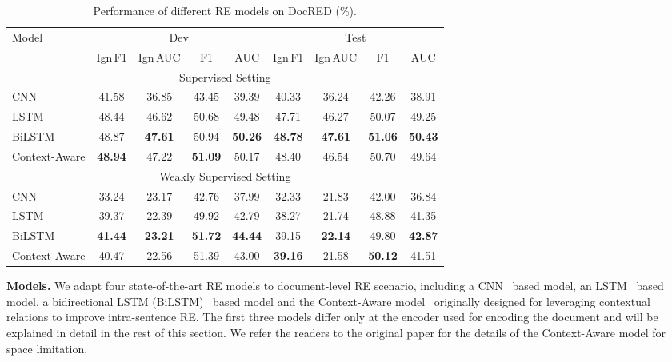 \documentclass[11pt,a4paper]{article}
\begin{document}
\begin{table*}
    \begin{center}
    \small
    \begin{tabular}{l|cccc|cccc}
    \toprule
    \multirow{2}{*}{Model} & \multicolumn{4}{c|}{Dev}& \multicolumn{4}{c}{Test} \\
     & Ign\,F1 & Ign\,AUC & F1 & AUC & Ign\,F1 & Ign\,AUC & F1 & AUC \\
    \midrule
    \multicolumn{9}{c}{Supervised Setting}\\
    \midrule
CNN & 41.58 &  36.85 & 43.45 & 39.39 & 40.33 & 36.24& 42.26 & 38.91\\
LSTM & 48.44 & 46.62 &50.68 & 49.48 & 47.71 & 46.27 & 50.07 & 49.25\\
BiLSTM & {48.87} & \textbf{47.61} & 50.94 & \textbf{50.26}  &\textbf{48.78} & \textbf{47.61} & \textbf{51.06} & \textbf{50.43}\\
Context-Aware & \textbf{48.94} & {47.22}& \textbf{51.09}& {50.17}& {48.40} & {46.54} & {50.70} & {49.64}\\    
    \midrule
    
    \multicolumn{9}{c}{Weakly Supervised Setting}\\
    \midrule
CNN & 33.24 & 23.17 & 42.76 & 37.99 & 32.33 & 21.83 & 42.00& 36.84\\
LSTM & 39.37& 22.39 & 49.92 & 42.79 & 38.27 & 21.74 & 48.88 & 41.35\\
BiLSTM & \textbf{41.44} & \textbf{23.21} & \textbf{51.72} & \textbf{44.44}  & 39.15 & \textbf{22.14} & 49.80 & \textbf{42.87}\\
Context-Aware & {40.47} & 22.56 & {51.39}& 43.00 & \textbf{39.16} & 21.58 & \textbf{50.12} & {41.51}\\
    \bottomrule
    \end{tabular}
    \end{center}
    \caption{Performance of different RE models on DocRED (\%).}
    \label{table:main results}
\end{table*}


\smallskip
\noindent
\textbf{Models.}
We adapt four state-of-the-art RE models to document-level RE scenario, including a CNN~\cite{DBLP:conf/coling/ZengLLZZ14} based model, an LSTM~\cite{DBLP:journals/neco/HochreiterS97} based model, a  bidirectional LSTM (BiLSTM)~\cite{cai2016bidirectional} based model and the Context-Aware model~\cite{DBLP:conf/emnlp/SorokinG17} originally designed for leveraging contextual relations to improve intra-sentence RE.
The first three models differ only at the encoder used for encoding the document and will be explained in detail in the rest of this section. We refer the readers to the original paper for the details of the Context-Aware model for space limitation.
\end{document}
